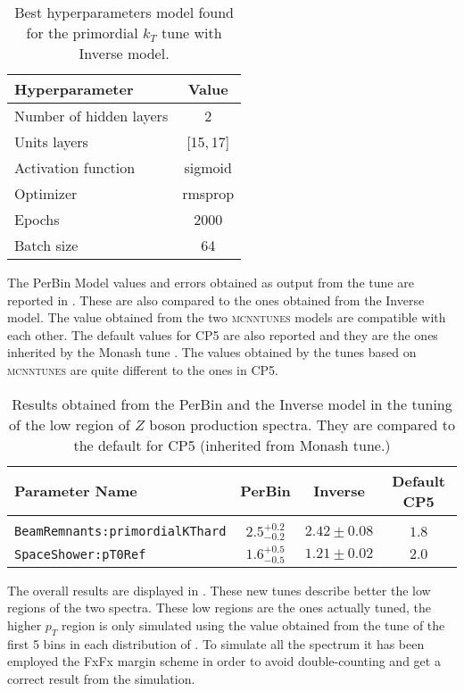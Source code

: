 \begin{table}[!htb]
	\centering
	\begin{tabular}{ l | c }
	Hyperparameter & Value\\[2pt]\hline\hline
	Number of hidden layers & 2 \\[2pt]
	Units layers & [15,\,17] \\[2pt]
	Activation function & sigmoid \\[2pt]
	Optimizer & rmsprop\\[2pt]
	Epochs & 2000\\[2pt]
	Batch size & 64\\[2pt]
	\end{tabular}
	\caption{Best hyperparameters model found for the primordial $k_T$ tune with Inverse model.}
	\label{table:hyperpar_PrimkT}
\end{table}


\noindent The PerBin Model values and errors obtained as output from the tune are reported in .  
These are also compared to the ones obtained from the Inverse model. The value obtained from the two \textsc{mcnntunes} models are compatible with each other. The default values for CP5 are also reported and they are the ones inherited by the Monash tune \cite{Monash}. The values obtained by the tunes based on \textsc{mcnntunes} are quite different to the ones in CP5.  

\begin{table}
	\centering
\begin{tabular}{l | c | c | c}
Parameter Name & PerBin & Inverse & Default CP5\\ 
\hline \hline
\\[-0.85em]
	\texttt{BeamRemnants:primordialKThard} & $ 2.5^{+0.2}_{-0.2} $ & $ 2.42\pm0.08 $ & $1.8$\\
	\texttt{SpaceShower:pT0Ref} & $ 1.6^{+0.5}_{-0.5} $ & $ 1.21\pm0.02  $ & $2.0$
\end{tabular}
\caption{Results obtained from the PerBin and the Inverse model in the tuning of the low region of $Z$ boson production spectra. They are compared to the default for CP5 (inherited from Monash tune.)}
\label{table:Primordial_kT_results}
\end{table}	

\medskip

The overall results are displayed in . These new tunes describe better the low regions of the two spectra. These low regions are the ones  actually tuned, the higher $p_T$ region is only simulated using the value obtained from the tune of the first 5 bins in each distribution of . To simulate all the spectrum it has been employed the FxFx margin scheme in order to avoid double-counting and get a correct result from the simulation.

